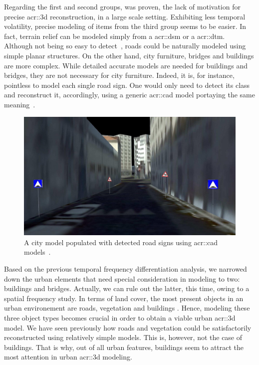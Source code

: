             Regarding the first and second groups, was proven, the lack of motivation for precise \gls{acr::3d} reconstruction, in a large scale setting.
            Exhibiting less temporal volatility, precise modeling of items from the third group seems to be easier.
            In fact, terrain relief can be modeled simply from a \gls{acr::dsm} or a \gls{acr::dtm}.
            Although not being so easy to detect~\parencite{mnih2010learning}, roads could be naturally modeled using simple planar structures.
            On the other hand, city furniture, bridges and buildings are more complex.
            While detailed accurate models are needed for buildings and bridges, they are not necessary for city furniture.
            Indeed, it is, for instance, pointless to model each single road sign.
            One would only need to detect its class and reconstruct it, accordingly, using a generic \gls{acr::cad} model portaying the same meaning~\parencite{soheilian2013detection}.\\
            \begin{figure}[htpb]
                \centering
                \includegraphics[width=\textwidth]{images/introduction/modeling_road_signs}
                \caption{
                    \label{fig::3d_road_signs_models} A city model populated with detected road signs using \gls{acr::cad} models~\parencite{soheilian2013detection}.
                }
            \end{figure}

            Based on the previous temporal frequency differentiation analysis, we narrowed down the urban elements that need special consideration in modeling to two: buildings and bridges. 
            Actually, we can rule out the latter, this time, owing to a spatial frequency study.
            In terms of land cover, the most present objects in an urban environement are roads, vegetation and buildings \addref.
            Hence, modeling these three object types becomes crucial in order to obtain a viable urban \gls{acr::3d} model.
            We have seen previously how roads and vegetation could be satisfactorily reconstructed using relatively simple models.
            This is, however, not the case of buildings.
            That is why, out of all urban features, buildings seem to attract the most attention in urban \gls{acr::3d} modeling.

